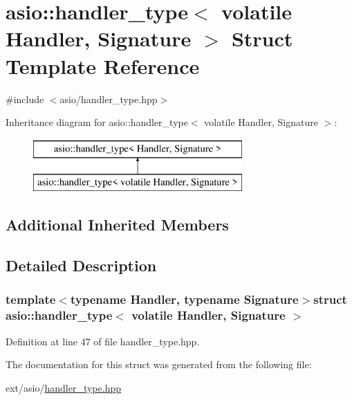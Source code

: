 \hypertarget{structasio_1_1handler__type_3_01volatile_01_handler_00_01_signature_01_4}{}\section{asio\+:\+:handler\+\_\+type$<$ volatile Handler, Signature $>$ Struct Template Reference}
\label{structasio_1_1handler__type_3_01volatile_01_handler_00_01_signature_01_4}


{\ttfamily \#include $<$asio/handler\+\_\+type.\+hpp$>$}

Inheritance diagram for asio\+:\+:handler\+\_\+type$<$ volatile Handler, Signature $>$\+:\begin{figure}[H]
\begin{center}
\leavevmode
\includegraphics[height=2.000000cm]{structasio_1_1handler__type_3_01volatile_01_handler_00_01_signature_01_4}
\end{center}
\end{figure}
\subsection*{Additional Inherited Members}


\subsection{Detailed Description}
\subsubsection*{template$<$typename Handler, typename Signature$>$struct asio\+::handler\+\_\+type$<$ volatile Handler, Signature $>$}



Definition at line 47 of file handler\+\_\+type.\+hpp.



The documentation for this struct was generated from the following file\+:\begin{DoxyCompactItemize}
\item 
ext/asio/\hyperlink{handler__type_8hpp}{handler\+\_\+type.\+hpp}\end{DoxyCompactItemize}
